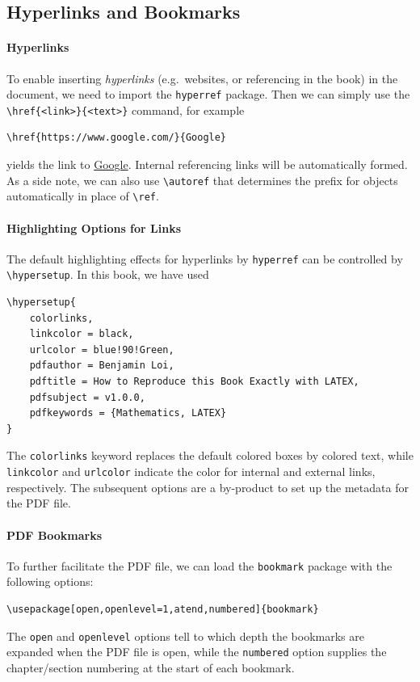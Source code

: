\subsection{Hyperlinks and Bookmarks}

\paragraph{Hyperlinks} 
To enable inserting \textit{hyperlinks} (e.g.\ websites, or referencing in the book) in the document, we need to import the \texttt{hyperref} package. Then we can simply use the \texttt{\textbackslash href\{<link>\}\{<text>\}} command, for example
\begin{lstlisting}
\href{https://www.google.com/}{Google}
\end{lstlisting}
yields the link to \href{https://www.google.com/}{Google}. Internal referencing links will be automatically formed. As a side note, we can also use \texttt{\textbackslash autoref} that determines the prefix for objects automatically in place of \texttt{\textbackslash ref}. 

\paragraph{Highlighting Options for Links} The default highlighting effects for hyperlinks by \texttt{hyperref} can be controlled by \texttt{\textbackslash hypersetup}. In this book, we have used
\begin{lstlisting}
\hypersetup{
    colorlinks,
    linkcolor = black,
    urlcolor = blue!90!Green,
    pdfauthor = Benjamin Loi,
    pdftitle = How to Reproduce this Book Exactly with LATEX,
    pdfsubject = v1.0.0,
    pdfkeywords = {Mathematics, LATEX}
}
\end{lstlisting}
The \texttt{colorlinks} keyword replaces the default colored boxes by colored text, while \texttt{linkcolor} and \texttt{urlcolor} indicate the color for internal and external links, respectively. The subsequent options are a by-product to set up the metadata for the PDF file.

\paragraph{PDF Bookmarks} To further facilitate the PDF file, we can load the \texttt{bookmark} package with the following options:
\begin{lstlisting}
\usepackage[open,openlevel=1,atend,numbered]{bookmark}
\end{lstlisting}
The \texttt{open} and \texttt{openlevel} options tell to which depth the bookmarks are expanded when the PDF file is open, while the \texttt{numbered} option supplies the chapter/section numbering at the start of each bookmark.

